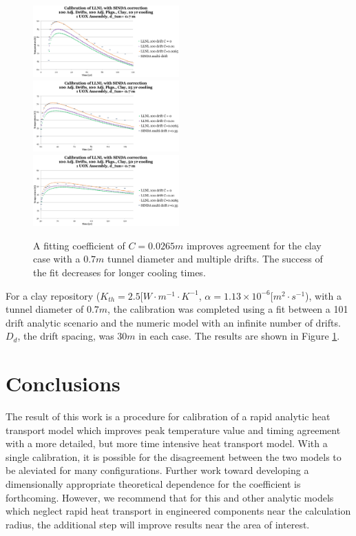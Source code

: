\documentclass{anstrans}
\begin{document}
\begin{figure}[h!]
  \centering
    \includegraphics[width=0.5\textwidth]{100drift10yr.eps}
    \includegraphics[width=0.5\textwidth]{100drift25yr.eps}
    \includegraphics[width=0.5\textwidth]{100drift50yr.eps}
  \caption{A fitting coefficient of $C=0.0265m$ improves agreement for the clay 
  case with a $0.7m$ tunnel diameter and multiple drifts. The success of the fit 
  decreases for longer cooling times.}
  \label{fig:fit}
\end{figure}

For a clay repository ($K_{th} = 2.5 [W\cdot m^{-1}\cdot K^{-1}$, $\alpha = 
1.13\times10^{-6}[m^2\cdot s^{-1}$), with a tunnel diameter of $0.7m$, the 
calibration was completed using a fit between a 101 drift analytic scenario 
and the numeric model with an infinite number of drifts. $D_{d}$, the drift 
spacing, was $30m$ in each case. The results are shown in Figure \ref{fig:fit}.

\section{Conclusions}

The result of this work is a procedure for calibration of a rapid analytic 
heat transport model which improves peak temperature value and timing agreement 
with a more detailed, but more time intensive heat transport model. With a 
single calibration, it is possible for the disagreement between the two models to 
be aleviated for many configurations. Further work toward developing a 
dimensionally appropriate theoretical dependence for the coefficient is 
forthcoming. However, we recommend that for this and other 
analytic models which neglect rapid heat transport in engineered components 
near the calculation radius, the additional step will improve results near the 
area of interest.



\end{document}
